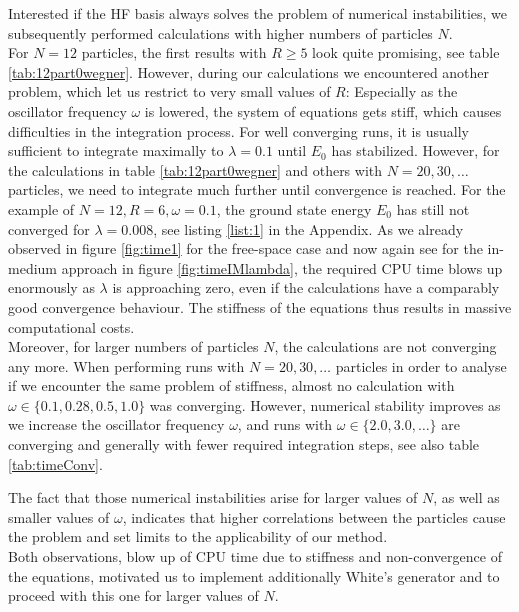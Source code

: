 Interested if the HF basis always solves the problem of numerical instabilities, we subsequently 
performed calculations with higher numbers of particles $N$.\\
For $N=12$ particles, the first results with $R\ge 5$ look quite promising, see table \ref{tab:12part0wegner}. However, during our calculations we encountered another problem, which let us restrict to very small values of $R$: Especially as the oscillator frequency $\omega$ is lowered, the system of equations gets stiff, which causes difficulties in the integration process. For well converging runs, it is usually sufficient to integrate maximally to $\lambda=0.1$ until $E_0$ has stabilized. However, for the calculations in table \ref{tab:12part0wegner} and others with $N=20,30,\dots$ particles, we need to integrate much further until convergence is reached. For the example of  $N=12, R=6,\omega=0.1$, the ground state energy $E_0$ has still not converged  for $\lambda=0.008$, see listing \ref{list:1} in the Appendix. As we already observed in figure \ref{fig:time1} for the free-space case and now again see for the in-medium approach in figure \ref{fig:timeIMlambda}, the required CPU time blows up enormously as $\lambda$ is approaching zero, even if the calculations have a comparably good convergence behaviour. The stiffness of the equations thus results in massive computational costs.\\
Moreover, for larger numbers of particles $N$, the calculations are not converging any more. When performing runs with $N=20,30,\dots$ particles in order to analyse if we encounter the same problem of stiffness, almost no calculation with $\omega\in\lbrace 0.1,0.28,0.5,1.0\rbrace$ was converging. However,  numerical stability improves as we increase the oscillator frequency $\omega$, and runs with $\omega \in \lbrace 2.0,3.0,\dots\rbrace$ are converging and generally with fewer required integration steps, see also table \ref{tab:timeConv}.


The fact that those numerical instabilities arise for larger values of $N$, as well as smaller values of $\omega$, indicates that higher correlations between the particles cause the problem and set limits to the applicability of our method.\\
Both observations, blow up of CPU time due to stiffness and non-convergence of the equations, motivated us to implement additionally White's generator and to proceed with this one for larger values of $N$.

